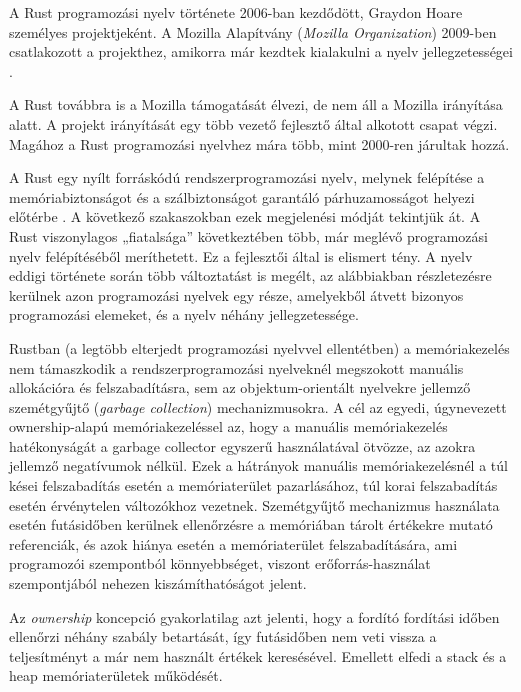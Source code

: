 

A Rust programozási nyelv története 2006-ban kezdődött, Graydon Hoare személyes projektjeként. A Mozilla Alapítvány (\textit{Mozilla Organization}) 2009-ben csatlakozott a projekthez, amikorra már kezdtek kialakulni a nyelv jellegzetességei \cite{rustbook}.

A Rust továbbra is a Mozilla támogatását élvezi, de nem áll a Mozilla irányítása alatt. A projekt irányítását egy több vezető fejlesztő által alkotott csapat végzi. Magához a Rust programozási nyelvhez mára több, mint 2000-ren járultak hozzá.


A Rust egy nyílt forráskódú rendszerprogramozási nyelv, melynek felépítése a memóriabiztonságot és a szálbiztonságot garantáló párhuzamosságot helyezi előtérbe \cite{docrustlang}. A következő szakaszokban ezek megjelenési módját tekintjük át. A Rust viszonylagos „fiatalsága” következtében több, már meglévő programozási nyelv felépítéséből meríthetett. Ez a fejlesztői által is elismert tény. A nyelv eddigi története során több változtatást is megélt, az alábbiakban részletezésre kerülnek azon programozási nyelvek egy része, amelyekből átvett bizonyos programozási elemeket, és a nyelv néhány jellegzetessége.
 

Rustban (a legtöbb elterjedt programozási nyelvvel ellentétben) a memóriakezelés nem támaszkodik a rendszerprogramozási nyelveknél megszokott manuális allokációra és felszabadításra, sem az objektum-orientált nyelvekre jellemző szemétgyűjtő (\textit{garbage collection}) mechanizmusokra. A cél az egyedi, úgynevezett ownership-alapú memóriakezeléssel az, hogy a manuális memóriakezelés hatékonyságát a garbage collector egyszerű használatával ötvözze, az azokra jellemző negatívumok nélkül. Ezek a hátrányok manuális memóriakezelésnél a túl kései felszabadítás esetén a memóriaterület pazarlásához, túl korai felszabadítás esetén érvénytelen változókhoz vezetnek. Szemétgyűjtő mechanizmus használata esetén futásidőben kerülnek ellenőrzésre a memóriában tárolt értékekre mutató referenciák, és azok hiánya esetén a memóriaterület felszabadítására, ami programozói szempontból könnyebbséget, viszont erőforrás-használat szempontjából nehezen kiszámíthatóságot jelent.

Az \textit{ownership} koncepció gyakorlatilag azt jelenti, hogy a fordító fordítási időben ellenőrzi néhány szabály betartását, így futásidőben nem veti vissza a teljesítményt a már nem használt értékek keresésével. Emellett elfedi a stack és a heap memóriaterületek működését.

